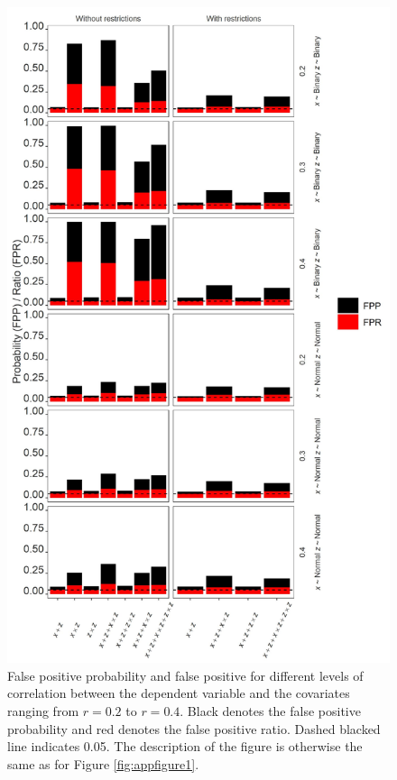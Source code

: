 \begin{landscape}
\begin{figure}[hbt!]
\includegraphics[scale=0.7]{R/Analysis/Result/Figures/Figure2SI.jpeg}
\centering
\caption{False positive probability and false positive for different levels of correlation between the dependent variable and the covariates ranging from  $\textit{r}=0.2$ to  $\textit{r}=0.4$. Black denotes the false positive probability and red denotes the false positive ratio. Dashed blacked line indicates 0.05. The description of the figure is otherwise the same as for Figure \ref{fig:appfigure1}.}
\label{fig:appfigure2}
\end{figure}
\end{landscape}

